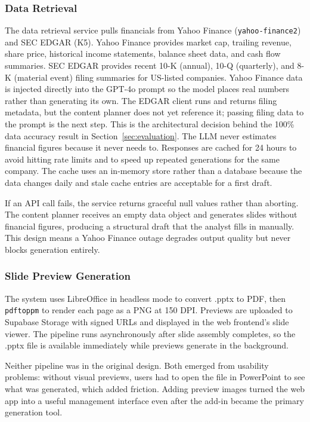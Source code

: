 \subsubsection{Data Retrieval}

The data retrieval service pulls financials from Yahoo Finance (\texttt{yahoo-finance2}) and SEC EDGAR (K5). Yahoo Finance provides market cap, trailing revenue, share price, historical income statements, balance sheet data, and cash flow summaries. SEC EDGAR provides recent 10-K (annual), 10-Q (quarterly), and 8-K (material event) filing summaries for US-listed companies. Yahoo Finance data is injected directly into the GPT-4o prompt so the model places real numbers rather than generating its own. The EDGAR client runs and returns filing metadata, but the content planner does not yet reference it; passing filing data to the prompt is the next step. This is the architectural decision behind the 100\% data accuracy result in Section~\ref{sec:evaluation}. The LLM never estimates financial figures because it never needs to. Responses are cached for 24 hours to avoid hitting rate limits and to speed up repeated generations for the same company. The cache uses an in-memory store rather than a database because the data changes daily and stale cache entries are acceptable for a first draft.

If an API call fails, the service returns graceful null values rather than aborting. The content planner receives an empty data object and generates slides without financial figures, producing a structural draft that the analyst fills in manually. This design means a Yahoo Finance outage degrades output quality but never blocks generation entirely.

\subsubsection{Slide Preview Generation}

The system uses LibreOffice in headless mode to convert .pptx to PDF, then \texttt{pdftoppm} to render each page as a PNG at 150 DPI. Previews are uploaded to Supabase Storage with signed URLs and displayed in the web frontend's slide viewer. The pipeline runs asynchronously after slide assembly completes, so the .pptx file is available immediately while previews generate in the background.

Neither pipeline was in the original design. Both emerged from usability problems: without visual previews, users had to open the file in PowerPoint to see what was generated, which added friction. Adding preview images turned the web app into a useful management interface even after the add-in became the primary generation tool.

